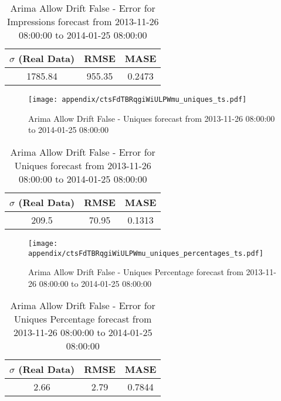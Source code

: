 \begin{table}[H]
\centering
\footnotesize
\begin{tabular}{ccc}
$\sigma$ (Real Data) & RMSE & MASE   \\ \hline
1785.84 & 955.35 & 0.2473 \\
\end{tabular}

\vspace{0.5cm}

\caption[]{
Arima Allow Drift False - Error for Impressions forecast from 2013-11-26 08:00:00 to 2014-01-25 08:00:00}
\end{table}

\begin{figure}[H] \begin{center} \leavevmode
\texttt{[image: appendix/ctsFdTBRqgiWiULPWmu\_uniques\_ts.pdf]} \caption[]{
Arima Allow Drift False - Uniques forecast from 2013-11-26 08:00:00 to 2014-01-25 08:00:00} \label{fig:appendix/ctsFdTBRqgiWiULPWmu_uniques_ts.pdf} \end{center}
\end{figure}

\begin{table}[H]
\centering
\footnotesize
\begin{tabular}{ccc}
$\sigma$ (Real Data) & RMSE & MASE   \\ \hline
209.5 & 70.95 & 0.1313 \\
\end{tabular}

\vspace{0.5cm}

\caption[]{
Arima Allow Drift False - Error for Uniques forecast from 2013-11-26 08:00:00 to 2014-01-25 08:00:00}
\end{table}

\begin{figure}[H] \begin{center} \leavevmode
\texttt{[image: appendix/ctsFdTBRqgiWiULPWmu\_uniques\_percentages\_ts.pdf]} \caption[]{
Arima Allow Drift False - Uniques Percentage forecast from 2013-11-26 08:00:00 to 2014-01-25 08:00:00} \label{fig:appendix/ctsFdTBRqgiWiULPWmu_uniques_percentages_ts.pdf} \end{center}
\end{figure}

\begin{table}[H]
\centering
\footnotesize
\begin{tabular}{ccc}
$\sigma$ (Real Data) & RMSE & MASE   \\ \hline
2.66 & 2.79 & 0.7844 \\
\end{tabular}

\vspace{0.5cm}

\caption[]{
Arima Allow Drift False - Error for Uniques Percentage forecast from 2013-11-26 08:00:00 to 2014-01-25 08:00:00}
\end{table}

